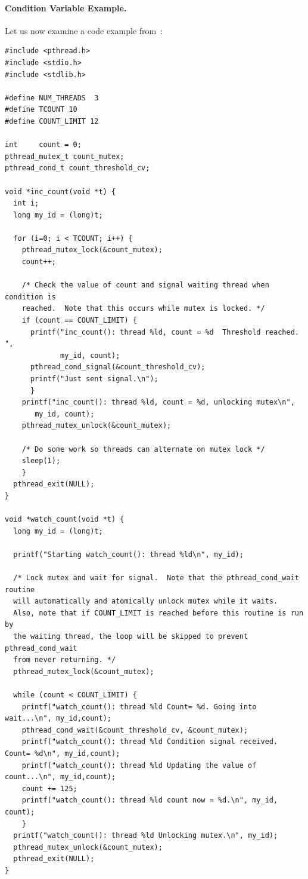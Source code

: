 \paragraph{Condition Variable Example.} Let us now examine a code example from~\cite{pthreads}:
{\scriptsize
\begin{verbatim}
#include <pthread.h>
#include <stdio.h>
#include <stdlib.h>

#define NUM_THREADS  3
#define TCOUNT 10
#define COUNT_LIMIT 12

int     count = 0;
pthread_mutex_t count_mutex;
pthread_cond_t count_threshold_cv;

void *inc_count(void *t) {
  int i;
  long my_id = (long)t;

  for (i=0; i < TCOUNT; i++) {
    pthread_mutex_lock(&count_mutex);
    count++;

    /* Check the value of count and signal waiting thread when condition is
    reached.  Note that this occurs while mutex is locked. */
    if (count == COUNT_LIMIT) {
      printf("inc_count(): thread %ld, count = %d  Threshold reached. ",
             my_id, count);
      pthread_cond_signal(&count_threshold_cv);
      printf("Just sent signal.\n");
      }
    printf("inc_count(): thread %ld, count = %d, unlocking mutex\n", 
       my_id, count);
    pthread_mutex_unlock(&count_mutex);

    /* Do some work so threads can alternate on mutex lock */
    sleep(1);
    }
  pthread_exit(NULL);
}

void *watch_count(void *t) {
  long my_id = (long)t;

  printf("Starting watch_count(): thread %ld\n", my_id);

  /* Lock mutex and wait for signal.  Note that the pthread_cond_wait routine
  will automatically and atomically unlock mutex while it waits. 
  Also, note that if COUNT_LIMIT is reached before this routine is run by
  the waiting thread, the loop will be skipped to prevent pthread_cond_wait
  from never returning. */
  pthread_mutex_lock(&count_mutex);
  
  while (count < COUNT_LIMIT) {
    printf("watch_count(): thread %ld Count= %d. Going into wait...\n", my_id,count);
    pthread_cond_wait(&count_threshold_cv, &count_mutex);
    printf("watch_count(): thread %ld Condition signal received. Count= %d\n", my_id,count);
    printf("watch_count(): thread %ld Updating the value of count...\n", my_id,count);
    count += 125;
    printf("watch_count(): thread %ld count now = %d.\n", my_id, count);
    }
  printf("watch_count(): thread %ld Unlocking mutex.\n", my_id);
  pthread_mutex_unlock(&count_mutex);
  pthread_exit(NULL);
}


\end{verbatim}}
